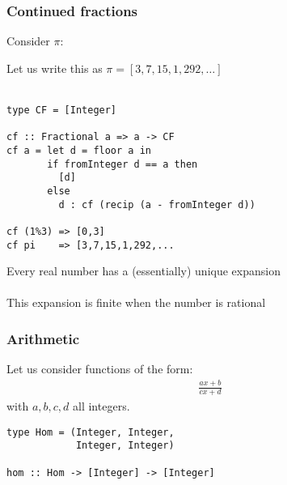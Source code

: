 \documentclass[11pt,aspectratio=169]{beamer}
\begin{document}
\begin{frame}
\frametitle{Continued fractions}
Consider $\pi$:
\end{frame}

\begin{frame}[fragile]
Let us write this as $\pi = [3,7,15,1,292,\dots]$
\\~\\
\begin{verbatim}
type CF = [Integer]

cf :: Fractional a => a -> CF
cf a = let d = floor a in
       if fromInteger d == a then
         [d]
       else
         d : cf (recip (a - fromInteger d))

cf (1%3) => [0,3]
cf pi    => [3,7,15,1,292,...
\end{verbatim}
Every real number has a (essentially) unique expansion
\\~\\
This expansion is finite when the number is rational
\end{frame}

\begin{frame}[fragile]
\frametitle{Arithmetic}
Let us consider functions of the form:
\begin{align*}
\frac{ax + b}{cx + d}
\end{align*}
with $a,b,c,d$ all integers.
\begin{verbatim}
type Hom = (Integer, Integer,
            Integer, Integer)

hom :: Hom -> [Integer] -> [Integer]
\end{verbatim}
\end{frame}
\end{document}
